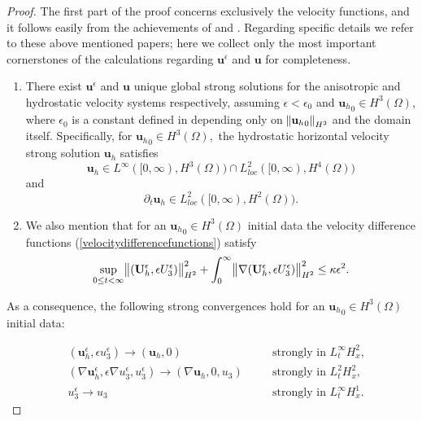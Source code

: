 \documentclass[11pt, a4paper]{article}
\begin{document}
\begin{proof}
The first part of the proof concerns exclusively the velocity functions, and it follows easily from the achievements of \cite{li2019primitive} and \cite{petcu2005sobolev}. Regarding specific details we refer to these above mentioned papers; here we collect only the most important cornerstones of the calculations regarding $\mathbf{u}^\epsilon$ and $\mathbf{u}$ for completeness.
\begin{enumerate}
\item There exist $\mathbf{u}^\epsilon$ and $\mathbf{u}$ unique global strong solutions for the anisotropic and hydrostatic velocity systems respectively, assuming $\epsilon < \epsilon_0$ and ${\mathbf{u}_h}_0 \in H^3(\Omega)$, where  $\epsilon_0$ is a constant defined in \cite{li2019primitive} depending only on $\norm{{\mathbf{u}_h}_0}_{H^3}$ and the domain itself.
Specifically, for ${\mathbf{u}_h}_0 \in H^3(\Omega),$ the hydrostatic horizontal velocity strong solution $\mathbf{u}_h$ satisfies
%
\begin{equation} \label{u_regularities_first}
\mathbf{u}_h \in L^\infty([0, \infty), H^3(\Omega)) \cap L^2_{loc}([0, \infty), H^4(\Omega))
\end{equation}
%
and
%
\begin{equation} \label{u_regularities_second}
\partial_t \mathbf{u}_h \in L^2_{loc}([0, \infty), H^2(\Omega)).
\end{equation}
%
\item We also mention that for an ${\mathbf{u}_h}_0 \in H^3(\Omega)$ initial data the velocity difference functions (\ref{velocitydifferencefunctions}) satisfy
%
\begin{equation} \label{UdifferenceEstimate}
\sup_{0 \leq t < \infty}{\norm{(\mathbf{U}_h^\epsilon, \epsilon U_3^\epsilon)}_{H^2}^2} + \int_0^\infty \norm{\nabla (\mathbf{U}_h^\epsilon, \epsilon U_3^\epsilon)}_{H^2}^2 \leq \kappa \epsilon^2.
\end{equation}

\end{enumerate}

As a consequence, the following strong convergences hold for an ${\mathbf{u}_h}_0 \in H^3(\Omega)$ initial data:

\begin{align}
& (\mathbf{u}_h^\epsilon, \epsilon u_3^\epsilon) \to (\mathbf{u}_h, 0) &\quad & \text{strongly in $L_t^\infty H_x^2$,} \label{StrongConvVelocity1} \\
& (\nabla \mathbf{u}_h^\epsilon, \epsilon \nabla u_3^\epsilon, u_3^\epsilon) \to (\nabla \mathbf{u}_h, 0, u_3) &\quad & \text{strongly in $L_t^2 H_x^2$,} \label{StrongConvVelocity2} \\ 
& u_3^\epsilon \to u_3 &\quad & \text{strongly in $L_t^\infty H_x^1.$} \label{StrongConvVelocity3}
\end{align}


\end{proof}
\end{document}
